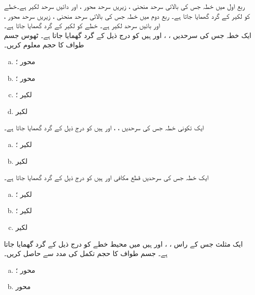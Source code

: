 ربع اول میں خطہ جس کی بالائی سرحد منحنی ، زیریں سرحد محور ، اور دائیں سرحد لکیر  ہے۔خطے کو لکیر  کے گرد گھمایا جاتا ہے۔
ربع دوم میں خطہ جس کی بالائی سرحد منحنی ، زیریں سرحد محور ،  اور بائیں  سرحد لکیر  ہے۔ خطے کو لکیر  کے گرد گھمایا جاتا ہے۔
\\
ایک خطہ جس کی سرحدیں ، ،  اور  ہیں کو درج ذیل کے گرد گھمایا جاتا ہے۔ ٹھوس جسم طواف کا حجم معلوم کریں۔
\begin{enumerate}[a.]
\item
محور ؛
\item
محور ؛
\item
لکیر ؛
\item
لکیر 
\end{enumerate}
ایک تکونی خطہ  جس کی سرحدیں ، ،  اور  ہیں کو درج ذیل کے گرد گھمایا جاتا ہے۔
\begin{enumerate}[a.]
\item
لکیر ؛
\item
لکیر 
\end{enumerate}
ایک خطہ جس کی سرحدیں قطع مکافی  اور  ہیں کو درج ذیل کے گرد گھمایا جاتا ہے۔
\begin{enumerate}[a.]
\item
لکیر ؛
\item
لکیر ؛
\item
لکیر 
\end{enumerate}
ایک مثلث جس کے راس ، ،  اور  ہیں میں محیط خطے کو درج ذیل کے گرد گھمایا جاتا ہے۔ جسم طواف کا حجم تکمل کی مدد سے حاصل کریں۔
\begin{enumerate}[a.]
\item
محور ؛
\item
محور 
\end{enumerate}
